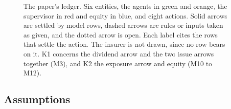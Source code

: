 \begin{landscape}
\begin{figure}[p]
\centering
{}
\caption{The paper's ledger. Six entities, the agents in green and orange, the
supervisor in red and equity in blue, and eight actions. Solid arrows are
settled by model rows, dashed arrows are rules or inputs taken as given, and
the dotted arrow is open. Each label cites the rows that settle the action.
The insurer is not drawn, since no row bears on it. K1 concerns the dividend
arrow and the two issue arrows together (M3), and K2 the exposure arrow and
equity (M10 to M12).}
\label{fig:ledger}
\end{figure}
\end{landscape}

\subsection{Assumptions}

